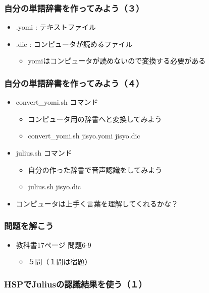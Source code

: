 \documentclass[14pt]{beamer}
\begin{document}
\begin{frame}
  \frametitle{自分の単語辞書を作ってみよう（３）}
  \begin{itemize}
    \item .yomi : テキストファイル
    \item .dic : コンピュータが読めるファイル
    \begin{itemize}
      \item yomiはコンピュータが読めないので変換する必要がある
    \end{itemize}
  \end{itemize}
\end{frame}

\begin{frame}
  \frametitle{自分の単語辞書を作ってみよう（４）}
  \begin{itemize}
    \item convert\_yomi.sh コマンド
    \begin{itemize}   
      \item コンピュータ用の辞書へと変換してみよう
      \item convert\_yomi.sh jisyo.yomi  jisyo.dic
    \end{itemize}
    \item julius.sh コマンド
    \begin{itemize}
      \item 自分の作った辞書で音声認識をしてみよう
      \item julius.sh jisyo.dic
    \end{itemize}
    \item コンピュータは上手く言葉を理解してくれるかな？
  \end{itemize}
\end{frame}

\begin{frame}
  \frametitle{問題を解こう}
  \begin{itemize}
    \item 教科書17ページ 問題6-9
    \begin{itemize}
      \item ５問（１問は宿題）
    \end{itemize}
  \end{itemize}
\end{frame}

\begin{frame}
  \frametitle{HSPでJuliusの認識結果を使う（１）}
  \begin{figure}
    
  \end{figure}
\end{frame}
\end{document}
